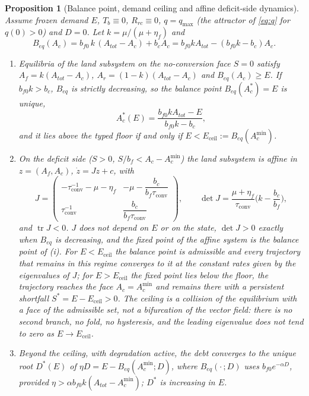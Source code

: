 \documentclass[preprint,12pt,authoryear]{elsarticle}
\newtheorem{proposition}{Proposition}
\newcommand{\Eceil}{E_{\mathrm{ceil}}}
\newcommand{\Acmin}{A_c^{\min}}
\newcommand{\tconv}{\tau_{\mathrm{conv}}}
\begin{document}
\begin{proposition}[Balance point, demand ceiling and affine deficit-side dynamics]\label{prop:ceiling}
Assume frozen demand $E$, $T_b\equiv0$, $R_{rc}\equiv0$, $q=q_{\max}$ (the attractor of \eqref{eq:q} for $q(0)>0$) and $D=0$. Let $k=\mu/(\mu+\eta_f)$ and
\begin{equation}\label{eq:Beq}
B_{eq}(A_c)=b_{f0}\,k\,(A_{tot}-A_c)+b_cA_c=b_{f0}kA_{tot}-(b_{f0}k-b_c)A_c .
\end{equation}
\begin{enumerate}[label=(\roman*)]
\item Equilibria of the land subsystem on the no-conversion face $S=0$ satisfy $A_f=k(A_{tot}-A_c)$, $A_r=(1-k)(A_{tot}-A_c)$ and $B_{eq}(A_c)\ge E$. If $b_{f0}k>b_c$, $B_{eq}$ is strictly decreasing, so the balance point $B_{eq}(A_c^*)=E$ is unique,
\begin{equation}\label{eq:Acstar}
A_c^*(E)=\frac{b_{f0}kA_{tot}-E}{b_{f0}k-b_c},
\end{equation}
and it lies above the typed floor if and only if $E<\Eceil:=B_{eq}(\Acmin)$.
\item On the deficit side ($S>0$, $S/b_f<A_c-\Acmin$) the land subsystem is affine in $z=(A_f,A_c)$, $\dot z=Jz+c$, with
\begin{equation}\label{eq:J}
J=\begin{pmatrix}-\tconv^{-1}-\mu-\eta_f & -\mu-\dfrac{b_c}{b_f\tconv}\\[8pt] \tconv^{-1} & \dfrac{b_c}{b_f\tconv}\end{pmatrix},
\qquad \det J=\frac{\mu+\eta_f}{\tconv}\Big(k-\frac{b_c}{b_f}\Big),
\end{equation}
and $\operatorname{tr}J<0$.
$J$ does not depend on $E$ or on the state, $\det J>0$ exactly when $B_{eq}$ is decreasing, and the fixed point of the affine system is the balance point of (i). For $E<\Eceil$ the balance point is admissible and every trajectory that remains in this regime converges to it at the constant rates given by the eigenvalues of $J$; for $E>\Eceil$ the fixed point lies below the floor, the trajectory reaches the face $A_c=\Acmin$ and remains there with a persistent shortfall $S^*=E-\Eceil>0$. The ceiling is a collision of the equilibrium with a face of the admissible set, not a bifurcation of the vector field: there is no second branch, no fold, no hysteresis, and the leading eigenvalue does not tend to zero as $E\to\Eceil$.
\item Beyond the ceiling, with degradation active, the debt converges to the unique root $D^*(E)$ of $\eta D=E-B_{eq}(\Acmin;D)$, where $B_{eq}(\cdot\,;D)$ uses $b_{f0}e^{-\alpha D}$, provided $\eta>\alpha b_{f0}k(A_{tot}-\Acmin)$; $D^*$ is increasing in $E$.
\end{enumerate}
\end{proposition}
\end{document}
